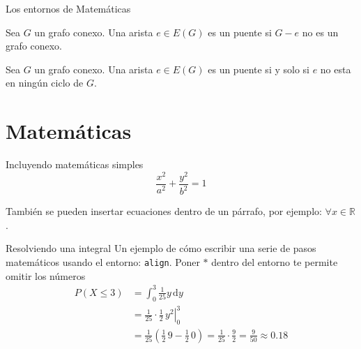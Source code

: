 \begin{frame}{Los entornos de Matemáticas}
 
\begin{mydef}[Puente]
  Sea $G$ un grafo conexo. Una arista $e \in E(G)$ es un \alert{puente} si $G - e$ no es un grafo conexo.
\end{mydef}
 
\begin{thm}
 Sea $G$ un grafo conexo. Una arista $e \in E(G)$ es un puente si y solo si $e$ no esta en ningún ciclo de $G$.
\end{thm}

\end{frame}

\section{Matemáticas}
\begin{frame}{Incluyendo matemáticas simples}
 \begin{equation}
 \label{eq:elipse}
 \frac{x^{2}}{a^{2}} + \frac{y^{2}}{b^{2}} = 1
 \end{equation}
 
  También se pueden insertar ecuaciones dentro de un párrafo, por ejemplo: $\forall x \in \mathbb{R}$.
\end{frame}

\begin{frame}{Resolviendo una integral}
Un ejemplo de cómo escribir una serie de pasos matemáticos usando el entorno: \texttt{align}.
Poner $*$ dentro del entorno te permite omitir los números
\begin{align*}
P\left(X \leq 3 \right) &= \int_{0}^{3} \frac{1}{25} y \,\mathrm{d}y \\
     &= \left. \frac{1}{25} \cdot \frac{1}{2} \, y^{2} \right|_0^3 \\
     &= \frac{1}{25} \left( \frac{1}{2} \, 9 - \frac{1}{2} \, 0 \right) =
     \frac{1}{25} \cdot \frac{9}{2} = \frac{9}{50} \approx 0.18 
\end{align*}
\end{frame}

